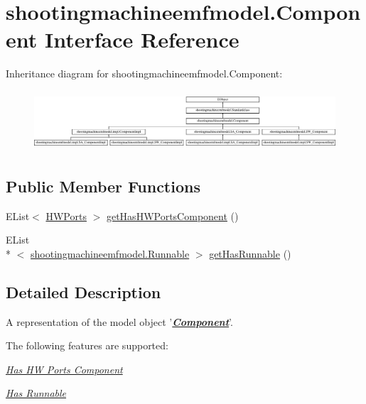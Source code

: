 \hypertarget{interfaceshootingmachineemfmodel_1_1_component}{\section{shootingmachineemfmodel.\-Component Interface Reference}
\label{interfaceshootingmachineemfmodel_1_1_component}
}
Inheritance diagram for shootingmachineemfmodel.\-Component\-:\begin{figure}[H]
\begin{center}
\leavevmode
\includegraphics[height=2.272727cm]{interfaceshootingmachineemfmodel_1_1_component}
\end{center}
\end{figure}
\subsection*{Public Member Functions}
\begin{DoxyCompactItemize}
\item 
E\-List$<$ \hyperlink{interfaceshootingmachineemfmodel_1_1_h_w_ports}{H\-W\-Ports} $>$ \hyperlink{interfaceshootingmachineemfmodel_1_1_component_a6f2301c79037a6e17d76b291122284bf}{get\-Has\-H\-W\-Ports\-Component} ()
\item 
E\-List\\*
$<$ \hyperlink{interfaceshootingmachineemfmodel_1_1_runnable}{shootingmachineemfmodel.\-Runnable} $>$ \hyperlink{interfaceshootingmachineemfmodel_1_1_component_a996eb3f8dce196b0fb04a5cf6124d9cd}{get\-Has\-Runnable} ()
\end{DoxyCompactItemize}


\subsection{Detailed Description}
A representation of the model object '{\itshape {\bfseries \hyperlink{interfaceshootingmachineemfmodel_1_1_component}{Component}}}'.

The following features are supported\-: 
\begin{DoxyItemize}
\item \hyperlink{interfaceshootingmachineemfmodel_1_1_component_a6f2301c79037a6e17d76b291122284bf}{{\itshape Has H\-W Ports Component}} 
\item \hyperlink{interfaceshootingmachineemfmodel_1_1_component_a996eb3f8dce196b0fb04a5cf6124d9cd}{{\itshape Has Runnable}} 
\end{DoxyItemize}


